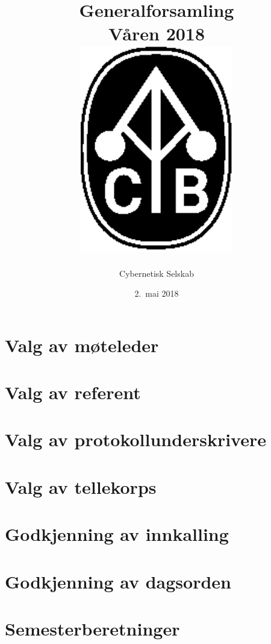 \documentclass[10pt,norsk,a4paper]{article}
\title{Generalforsamling \\
	Våren 2018\\[3cm]
	\includegraphics[width=0.5\textwidth]{cyb-logo.eps}\\[-.5cm]}
\date{2.\ mai 2018}
\author{Cybernetisk Selskab}
\begin{document}
\maketitle{}
\newpage
\tableofcontents{}


\section{Valg av møteleder}

\section{Valg av referent}

\section{Valg av protokollunderskrivere}

\section{Valg av tellekorps}

\section{Godkjenning av innkalling}

\section{Godkjenning av dagsorden}

\section{Semesterberetninger}
\end{document}
